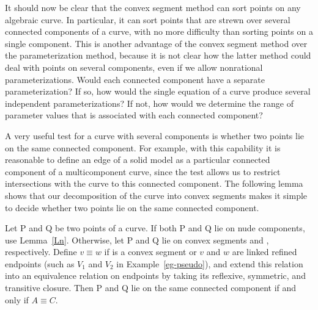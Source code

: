 It should now be clear that the convex segment method can sort points on any
algebraic curve.
In particular, it can sort points that are strewn over several connected 
components of a curve, with no more difficulty than sorting points on a single
component.
This is another advantage of the convex segment method over the parameterization
method, because it is not clear how the latter method could deal with points
on several components, even if we allow nonrational parameterizations.
%
%
Would each connected component have a separate parameterization?
If so, how would the single equation of a curve produce several independent 
parameterizations?
If not, how would we determine the range of parameter values that is associated 
with each connected component?

A very useful test for a curve with several components is whether two points 
lie on the same connected component.
For example, with this capability it is reasonable to define an edge of a solid model 
as a particular connected component of a multicomponent curve, since the test allows 
us to restrict intersections with the curve to this connected component.
The following lemma shows that our decomposition of 
the curve into convex segments makes it simple to decide whether two points lie on
the same connected component.

\begin{lemma}
Let P and Q be two points of a curve.
If both P and Q lie on nude components, use Lemma~{\rm\ref{Ln}}.
Otherwise, let P and Q lie on convex segments  and , respectively.
Define $v \equiv w$ if  is a convex segment 
or $v$ and $w$ are linked refined endpoints {\rm (}such as $V_{1}$ and $V_{2}$ in 
Example~{\rm\ref{eg-pseudo})}, and extend this relation into an equivalence relation 
on endpoints by taking its reflexive, symmetric, and transitive closure.
Then P and Q lie on the same connected component if and only if $A \equiv C$.
\end{lemma}

